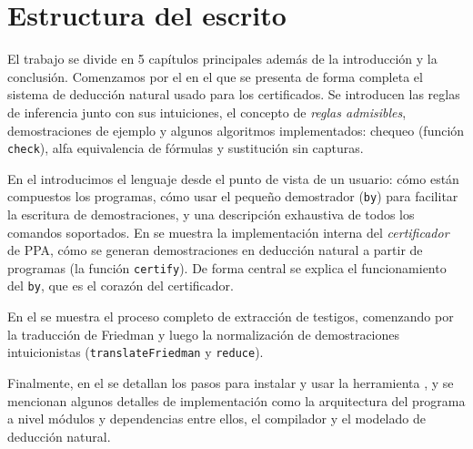 \section{Estructura del escrito}

El trabajo se divide en 5 capítulos principales además de la introducción y la conclusión. Comenzamos por el  en el que se presenta de forma completa el sistema de deducción natural usado para los certificados. Se introducen las reglas de inferencia junto con sus intuiciones, el concepto de \textit{reglas admisibles}, demostraciones de ejemplo y algunos algoritmos implementados: chequeo (función \texttt{check}), alfa equivalencia de fórmulas y sustitución sin capturas.

En el  introducimos el lenguaje desde el punto de vista de un usuario: cómo están compuestos los programas, cómo usar el pequeño demostrador (\lstinline{by}) para facilitar la escritura de demostraciones, y una descripción exhaustiva de todos los comandos soportados. En  se muestra la implementación interna del \textit{certificador} de PPA, cómo se generan demostraciones en deducción natural a partir de programas (la función \texttt{certify}). De forma central se explica el funcionamiento del \lstinline{by}, que es el corazón del certificador.

En el  se muestra el proceso completo de extracción de testigos, comenzando por la traducción de Friedman y luego la normalización de demostraciones intuicionistas (\texttt{translateFriedman} y \texttt{reduce}).

Finalmente, en el  se detallan los pasos para instalar y usar la herramienta \ppaTool{}, y se mencionan algunos detalles de implementación como la arquitectura del programa a nivel módulos y dependencias entre ellos, el compilador y el modelado de deducción natural.